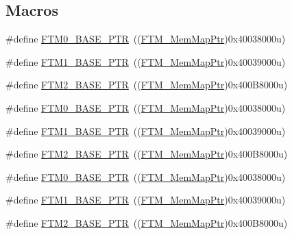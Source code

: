\subsection*{Macros}
\begin{DoxyCompactItemize}
\item 
\#define \hyperlink{group___f_t_m___peripheral_gae712c29b7abcf338d8f8f6418683fa66}{F\+T\+M0\+\_\+\+B\+A\+S\+E\+\_\+\+P\+TR}~((\hyperlink{group___f_t_m___peripheral_gaafa7875c9deb2b3afe4aa22ce6a99d39}{F\+T\+M\+\_\+\+Mem\+Map\+Ptr})0x40038000u)
\item 
\#define \hyperlink{group___f_t_m___peripheral_ga38115fba8eadfc94b2fc411f45906002}{F\+T\+M1\+\_\+\+B\+A\+S\+E\+\_\+\+P\+TR}~((\hyperlink{group___f_t_m___peripheral_gaafa7875c9deb2b3afe4aa22ce6a99d39}{F\+T\+M\+\_\+\+Mem\+Map\+Ptr})0x40039000u)
\item 
\#define \hyperlink{group___f_t_m___peripheral_ga897564efeaf1be1f991305d294eda3d6}{F\+T\+M2\+\_\+\+B\+A\+S\+E\+\_\+\+P\+TR}~((\hyperlink{group___f_t_m___peripheral_gaafa7875c9deb2b3afe4aa22ce6a99d39}{F\+T\+M\+\_\+\+Mem\+Map\+Ptr})0x400\+B8000u)
\item 
\#define \hyperlink{group___f_t_m___peripheral_gae712c29b7abcf338d8f8f6418683fa66}{F\+T\+M0\+\_\+\+B\+A\+S\+E\+\_\+\+P\+TR}~((\hyperlink{group___f_t_m___peripheral_gaafa7875c9deb2b3afe4aa22ce6a99d39}{F\+T\+M\+\_\+\+Mem\+Map\+Ptr})0x40038000u)
\item 
\#define \hyperlink{group___f_t_m___peripheral_ga38115fba8eadfc94b2fc411f45906002}{F\+T\+M1\+\_\+\+B\+A\+S\+E\+\_\+\+P\+TR}~((\hyperlink{group___f_t_m___peripheral_gaafa7875c9deb2b3afe4aa22ce6a99d39}{F\+T\+M\+\_\+\+Mem\+Map\+Ptr})0x40039000u)
\item 
\#define \hyperlink{group___f_t_m___peripheral_ga897564efeaf1be1f991305d294eda3d6}{F\+T\+M2\+\_\+\+B\+A\+S\+E\+\_\+\+P\+TR}~((\hyperlink{group___f_t_m___peripheral_gaafa7875c9deb2b3afe4aa22ce6a99d39}{F\+T\+M\+\_\+\+Mem\+Map\+Ptr})0x400\+B8000u)
\item 
\#define \hyperlink{group___f_t_m___peripheral_gae712c29b7abcf338d8f8f6418683fa66}{F\+T\+M0\+\_\+\+B\+A\+S\+E\+\_\+\+P\+TR}~((\hyperlink{group___f_t_m___peripheral_gaafa7875c9deb2b3afe4aa22ce6a99d39}{F\+T\+M\+\_\+\+Mem\+Map\+Ptr})0x40038000u)
\item 
\#define \hyperlink{group___f_t_m___peripheral_ga38115fba8eadfc94b2fc411f45906002}{F\+T\+M1\+\_\+\+B\+A\+S\+E\+\_\+\+P\+TR}~((\hyperlink{group___f_t_m___peripheral_gaafa7875c9deb2b3afe4aa22ce6a99d39}{F\+T\+M\+\_\+\+Mem\+Map\+Ptr})0x40039000u)
\item 
\#define \hyperlink{group___f_t_m___peripheral_ga897564efeaf1be1f991305d294eda3d6}{F\+T\+M2\+\_\+\+B\+A\+S\+E\+\_\+\+P\+TR}~((\hyperlink{group___f_t_m___peripheral_gaafa7875c9deb2b3afe4aa22ce6a99d39}{F\+T\+M\+\_\+\+Mem\+Map\+Ptr})0x400\+B8000u)
\end{DoxyCompactItemize}
